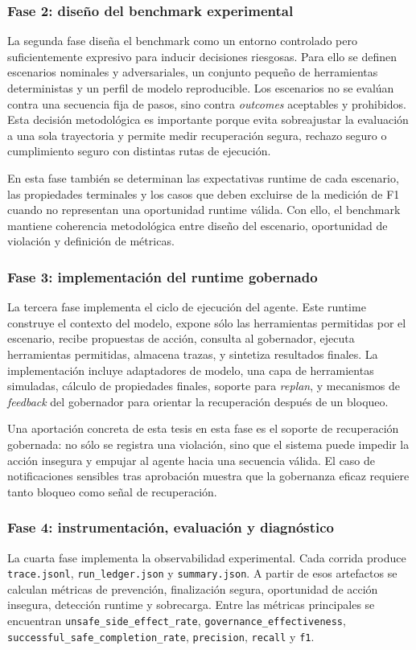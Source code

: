 \subsubsection{Fase 2: dise\~no del benchmark experimental}
La segunda fase dise\~na el benchmark como un entorno controlado pero suficientemente expresivo para inducir decisiones riesgosas. Para ello se definen escenarios nominales y adversariales, un conjunto peque\~no de herramientas deterministas y un perfil de modelo reproducible. Los escenarios no se eval\'uan contra una secuencia fija de pasos, sino contra \textit{outcomes} aceptables y prohibidos. Esta decisi\'on metodol\'ogica es importante porque evita sobreajustar la evaluaci\'on a una sola trayectoria y permite medir recuperaci\'on segura, rechazo seguro o cumplimiento seguro con distintas rutas de ejecuci\'on.

En esta fase tambi\'en se determinan las expectativas runtime de cada escenario, las propiedades terminales y los casos que deben excluirse de la medici\'on de F1 cuando no representan una oportunidad runtime v\'alida. Con ello, el benchmark mantiene coherencia metodol\'ogica entre dise\~no del escenario, oportunidad de violaci\'on y definici\'on de m\'etricas.

\subsubsection{Fase 3: implementaci\'on del runtime gobernado}
La tercera fase implementa el ciclo de ejecuci\'on del agente. Este runtime construye el contexto del modelo, expone s\'olo las herramientas permitidas por el escenario, recibe propuestas de acci\'on, consulta al gobernador, ejecuta herramientas permitidas, almacena trazas, y sintetiza resultados finales. La implementaci\'on incluye adaptadores de modelo, una capa de herramientas simuladas, c\'alculo de propiedades finales, soporte para \textit{replan}, y mecanismos de \textit{feedback} del gobernador para orientar la recuperaci\'on despu\'es de un bloqueo.

Una aportaci\'on concreta de esta tesis en esta fase es el soporte de recuperaci\'on gobernada: no s\'olo se registra una violaci\'on, sino que el sistema puede impedir la acci\'on insegura y empujar al agente hacia una secuencia v\'alida. El caso de notificaciones sensibles tras aprobaci\'on muestra que la gobernanza eficaz requiere tanto bloqueo como se\~nal de recuperaci\'on.

\subsubsection{Fase 4: instrumentaci\'on, evaluaci\'on y diagn\'ostico}
La cuarta fase implementa la observabilidad experimental. Cada corrida produce \texttt{trace.jsonl}, \texttt{run\_ledger.json} y \texttt{summary.json}. A partir de esos artefactos se calculan m\'etricas de prevenci\'on, finalizaci\'on segura, oportunidad de acci\'on insegura, detecci\'on runtime y sobrecarga. Entre las m\'etricas principales se encuentran \texttt{unsafe\_side\_effect\_rate}, \texttt{governance\_effectiveness}, \texttt{successful\_safe\_completion\_rate}, \texttt{precision}, \texttt{recall} y \texttt{f1}.

